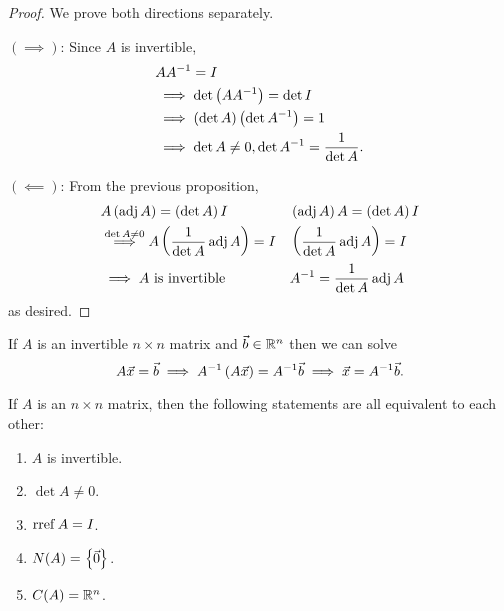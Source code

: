 \documentclass[main.tex]{subfiles}
\begin{document}
\begin{proof}
    We prove both directions separately.
    
    $(\implies)$: Since $A$ is invertible,
    \begin{align*}
        &AA^{-1} = I \\
        &\implies \det \left( AA^{-1} \right) = \det I \\
        &\implies \left( \det A \right)\left( \det A^{-1} \right) = 1 \\
        &\implies \det A \neq 0, \det A^{-1} = \frac{1}{\det A}.
    \end{align*}

    $(\impliedby)$: From the previous proposition,
    \begin{align*}
        &A\left( \operatorname{adj} A \right) = \left( \det A \right)I && \left( \operatorname{adj} A \right)A = \left( \det A \right)I \\
        &\overset{\det A \neq 0}{\implies} A\left( \frac{1}{\det A}\operatorname{adj} A \right) = I && \left( \frac{1}{\det A}\operatorname{adj} A \right) = I \\
        &\implies A\text{ is invertible} && A^{-1} = \frac{1}{\det A}\operatorname{adj} A
    \end{align*}
    as desired.
\end{proof}

\begin{remark}
    If $A$ is an invertible $n\times n$ matrix and $\vec{b}\in \mathbb R^n$ then we can solve
    \[A\vec{x} = \vec{b} \implies A^{-1}\left( A\vec{x} \right) = A^{-1}\vec{b} \implies \vec{x} = A^{-1}\vec{b}.\]
\end{remark}

\begin{theorem}
    If $A$ is an $n\times n$ matrix, then the following statements are all equivalent to each other:
    \begin{enumerate}
        \item $A$ is invertible.
        \item $\det A\neq 0$.
        \item $\operatorname{rref} A = I$.
        \item $N(A) = \left\{ \vec{0} \right\}$.
        \item $C(A) = \mathbb R^n$.
    \end{enumerate}
\end{theorem}
\end{document}
